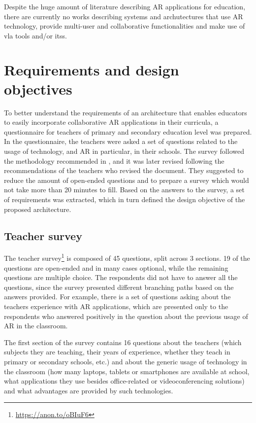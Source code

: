 Despite the huge amount of literature describing AR applications for education, there are currently no works describing systems and archutectures that use AR technology, provide multi-user and collaborative functionalities and make use of \gls{vla} tools and/or \glspl{its}.


\section{Requirements and design objectives}\label{arch:requirements}

To better understand the requirements of an architecture that enables educators to easily incorporate collaborative AR applications in their curricula, a questionnaire for teachers of primary and secondary education level was prepared. In the questionnaire, the teachers were asked a set of questions related to the usage of technology, and AR in particular, in their schools. The survey followed the methodology recommended in \citep[Chapter~5]{lazar2017research}, and it was later revised following the recommendations of the teachers who revised the document. They suggested to reduce the amount of open-ended questions and to prepare a survey which would not take more than 20 minutes to fill. Based on the answers to the survey, a set of requirements was extracted, which in turn defined the design objective of the proposed architecture. 

\subsection{Teacher survey}\label{sec:req:survey}

The teacher survey\footnote{\url{https://anon.to/oBIuF6}} is composed of 45 questions, split across 3 sections. 19 of the questions are open-ended and in many cases optional, while the remaining questions are multiple choice.
The respondents did not have to answer all the questions, since the survey presented different branching paths based on the answers provided. For example, there is a set of questions asking about the teachers experience with AR applications, which are presented only to the respondents who answered positively in the question about the previous usage of AR in the classroom.   

The first section of the survey contains 16 questions about the teachers (which subjects they are teaching, their years of experience, whether they teach in primary or secondary schools, etc.) and about the generic usage of technology in the classroom (how many laptops, tablets or smartphones are available at school, what applications they use besides office-related or videoconferencing solutions) and what advantages are provided by such technologies.

